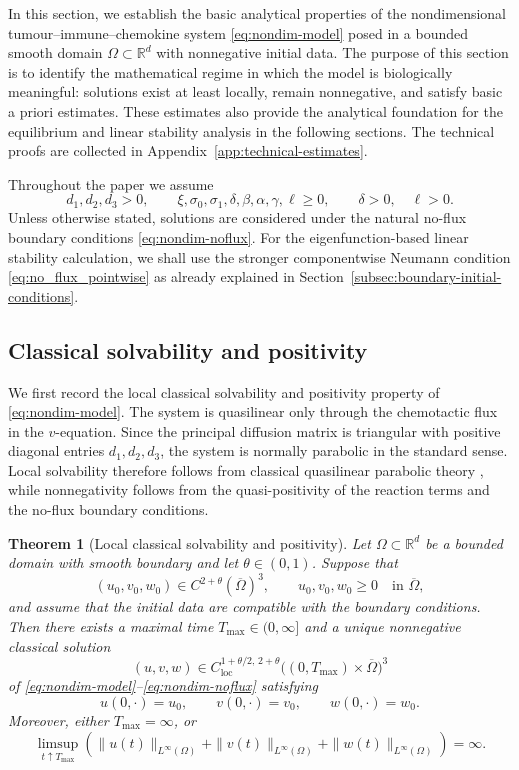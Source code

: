 \documentclass[a4paper,fleqn,longmktitle]{cas-sc}
\theoremstyle{plain}
\newtheorem{theorem}{Theorem}[section]
\theoremstyle{definition}
\numberwithin{equation}{section}
\begin{document}
In this section, we establish the basic analytical properties of the
nondimensional tumour--immune--chemokine system \eqref{eq:nondim-model}
posed in a bounded smooth domain $\Omega\subset\mathbb R^d$ with nonnegative
initial data. The purpose of this section is to identify the mathematical
regime in which the model is biologically meaningful: solutions exist at least
locally, remain nonnegative, and satisfy basic a priori estimates. These
estimates also provide the analytical foundation for the equilibrium and linear
stability analysis in the following sections. The technical proofs are collected
in Appendix~\ref{app:technical-estimates}.

Throughout the paper we assume
\[
d_1,d_2,d_3>0,\qquad
\xi,\sigma_0,\sigma_1,\delta,\beta,\alpha,\gamma,\ell\ge 0,
\qquad
\delta>0,\quad \ell>0.
\]
Unless otherwise stated, solutions are considered under the natural no-flux
boundary conditions \eqref{eq:nondim-noflux}.
For the eigenfunction-based linear stability calculation, we shall use the
stronger componentwise Neumann condition \eqref{eq:no_flux_pointwise}
as already explained in Section~\ref{subsec:boundary-initial-conditions}.

\subsection{Classical solvability and positivity}
\label{subsec:classical-solvability-positivity}

We first record the local classical solvability and positivity property of
\eqref{eq:nondim-model}. The system is quasilinear only through the
chemotactic flux in the $v$-equation. Since the principal diffusion matrix is
triangular with positive diagonal entries $d_1,d_2,d_3$, the system is normally
parabolic in the standard sense. Local solvability therefore follows from
classical quasilinear parabolic theory \cite{amann1993nonhomogeneous}, while nonnegativity follows from the
quasi-positivity of the reaction terms and the no-flux boundary conditions.

\begin{theorem}[Local classical solvability and positivity]
\label{thm:local-solvability-positivity}
Let $\Omega\subset\mathbb R^d$ be a bounded domain with smooth boundary and let
$\theta\in(0,1)$. Suppose that
\[
(u_0,v_0,w_0)\in C^{2+\theta}(\overline\Omega)^3,
\qquad
u_0,v_0,w_0\ge0\quad\text{in }\overline\Omega,
\]
and assume that the initial data are compatible with the boundary conditions.
Then there exists a maximal time $T_{\max}\in(0,\infty]$
and a unique nonnegative classical solution
\[
(u,v,w)\in C^{1+\theta/2,\,2+\theta}_{\mathrm{loc}}
\big((0,T_{\max})\times\overline\Omega\big)^3
\]
of \eqref{eq:nondim-model}--\eqref{eq:nondim-noflux} satisfying
\[
u(0,\cdot)=u_0,\qquad
v(0,\cdot)=v_0,\qquad
w(0,\cdot)=w_0.
\]
Moreover, either $T_{\max}=\infty$, or
\[
\limsup_{t\uparrow T_{\max}}
\left(
\|u(t)\|_{L^\infty(\Omega)}
+\|v(t)\|_{L^\infty(\Omega)}
+\|w(t)\|_{L^\infty(\Omega)}
\right)=\infty .
\]
\end{theorem}
\end{document}
